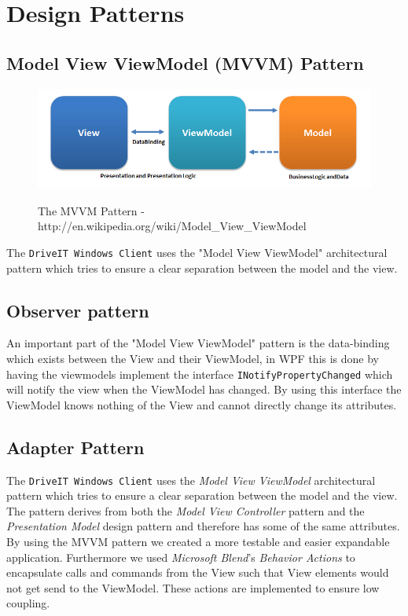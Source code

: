 \section{Design Patterns}
\subsection{Model View ViewModel (MVVM) Pattern}
\begin{figure}[H]
	\centering
	\includegraphics[scale=0.6]{Figures/WebImages/MVVMPattern}\\
	\caption{The MVVM Pattern - http://en.wikipedia.org/wiki/Model\_View\_ViewModel}
	\label{fig:MVVMPattern}
\end{figure}
The \texttt{DriveIT Windows Client} uses the "Model View ViewModel" architectural pattern which tries to ensure a clear separation between the model and the view. 
\subsection{Observer pattern}
An important part of the "Model View ViewModel" pattern is the data-binding which exists between the View and their ViewModel, in WPF this is done by having the viewmodels implement the interface \texttt{INotifyPropertyChanged} which will notify the view when the ViewModel has changed. By using this interface the ViewModel knows nothing of the View and cannot directly change its attributes.

\subsection{Adapter Pattern}
The \texttt{DriveIT Windows Client} uses the \emph{Model View ViewModel} architectural pattern which tries to ensure a clear separation between the model and the view. The pattern derives from both the \emph{Model View Controller} pattern and the \emph{Presentation Model} design pattern and therefore has some of the same attributes. By using the MVVM pattern we created a more testable and easier expandable application. Furthermore we used \emph{Microsoft Blend}'s \emph{Behavior Actions} to encapsulate calls and commands from the View such that View elements would not get send to the ViewModel. These actions are implemented to ensure low coupling.\\

